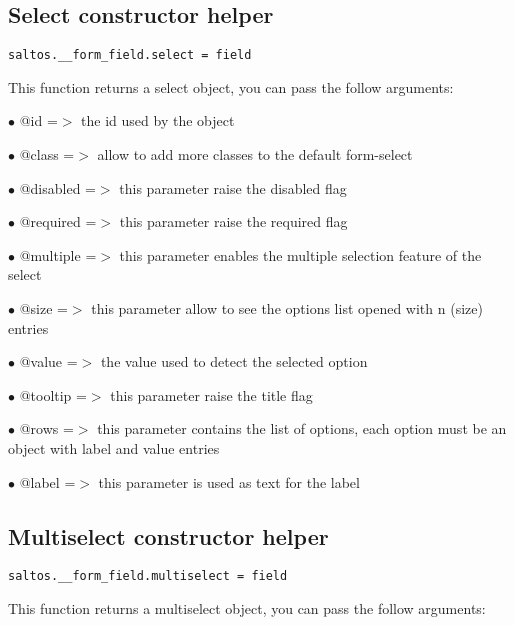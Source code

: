 \documentclass[a4paper]{book}
\begin{document}
\hypertarget{toc386}{}
\subsection{Select constructor helper}

\begin{lstlisting}
saltos.__form_field.select = field
\end{lstlisting}

This function returns a select object, you can pass the follow arguments:

\begin{compactitem}
\item[\color{myblue}$\bullet$] @id       =$>$ the id used by the object
\item[\color{myblue}$\bullet$] @class    =$>$ allow to add more classes to the default form-select
\item[\color{myblue}$\bullet$] @disabled =$>$ this parameter raise the disabled flag
\item[\color{myblue}$\bullet$] @required =$>$ this parameter raise the required flag
\item[\color{myblue}$\bullet$] @multiple =$>$ this parameter enables the multiple selection feature of the select
\item[\color{myblue}$\bullet$] @size     =$>$ this parameter allow to see the options list opened with n (size) entries
\item[\color{myblue}$\bullet$] @value    =$>$ the value used to detect the selected option
\item[\color{myblue}$\bullet$] @tooltip  =$>$ this parameter raise the title flag
\item[\color{myblue}$\bullet$] @rows     =$>$ this parameter contains the list of options, each option must be an object
             with label and value entries
\item[\color{myblue}$\bullet$] @label    =$>$ this parameter is used as text for the label
\end{compactitem}

\hypertarget{toc387}{}
\subsection{Multiselect constructor helper}

\begin{lstlisting}
saltos.__form_field.multiselect = field
\end{lstlisting}

This function returns a multiselect object, you can pass the follow arguments:
\end{document}
